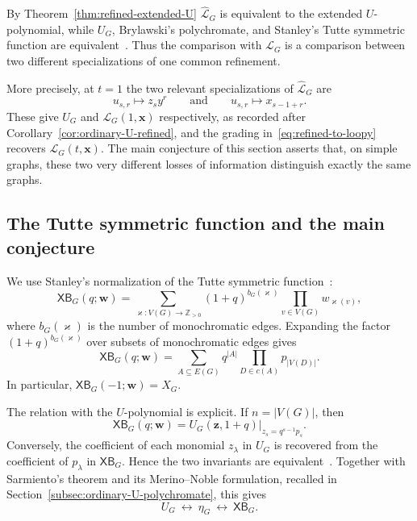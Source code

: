 \documentclass[11pt]{article}
\theoremstyle{plain}
\theoremstyle{definition}
\renewcommand{\mathcal}{\mathscr}
\newcommand{\LL}{\mathcal{L}}    %
\newcommand{\bw}{\mathbf{w}}
\newcommand{\bx}{\mathbf{x}}
\newcommand{\bz}{\mathbf{z}}
\newcommand{\XB}{\mathsf{XB}} %
\newcommand{\kp}{\varkappa}
\newcommand{\ZZ}{\mathbb Z}
\numberwithin{equation}{section}
\begin{document}
By Theorem~\ref{thm:refined-extended-U}
$\widehat{\LL}_G$ is equivalent to the extended
$U$-polynomial, while $U_G$, Brylawski's polychromate, and Stanley's Tutte
symmetric function are equivalent~\cite{NW,Sar,MN,Nob}.  Thus the comparison
with $\LL_G$ is a comparison between two different specializations of one common refinement.

More precisely, at $t=1$ the two relevant specializations of $\widehat{\LL}_G$ are
\begin{equation}\label{eq:two-specializations}
   u_{s,r}\longmapsto z_s y^r
   \qquad\text{and}\qquad
   u_{s,r}\longmapsto x_{s-1+r}.
\end{equation}
These give $U_G$ and $\LL_G(1,\bx)$ respectively, as recorded after
Corollary~\ref{cor:ordinary-U-refined}, and the grading
in~\eqref{eq:refined-to-loopy} recovers $\LL_G(t,\bx)$.  The main conjecture
of this section asserts that, on simple graphs, these two very different
losses of information distinguish exactly the same graphs.

\subsection{The Tutte symmetric function and the main conjecture}
\label{subsec:main-conjecture}

We use Stanley's normalization of the Tutte symmetric function~\cite{Sta2}:
\begin{equation}\label{eq:XB-coloring}
   \XB_G(q;\bw)
   =
   \sum_{\kp:V(G)\to\ZZ_{>0}}
   (1+q)^{b_G(\kp)}
   \prod_{v\in V(G)}w_{\kp(v)},
\end{equation}
where $b_G(\kp)$ is the number of monochromatic edges.  Expanding the
factor $(1+q)^{b_G(\kp)}$ over subsets of monochromatic edges gives
\begin{equation}\label{eq:XB-subgraph}
   \XB_G(q;\bw)
   =
   \sum_{A\subseteq E(G)}q^{|A|}
   \prod_{D\in c(A)}p_{|V(D)|}.
\end{equation}
In particular, $\XB_G(-1;\bw)=X_G$.

The relation with the $U$-polynomial is explicit.  If
$n=|V(G)|$, then
\begin{equation}\label{eq:XB-from-U}
   \XB_G(q;\bw)
   =
   \left.
      U_G(\bz,1+q)
   \right|_{z_s=q^{s-1}p_s}.
\end{equation}
Conversely, the coefficient of each monomial $z_\lambda$ in $U_G$ is
recovered from the coefficient of $p_\lambda$ in $\XB_G$.  Hence the two
invariants are equivalent~\cite{NW,MN,Nob}.  Together with Sarmiento's theorem
and its Merino--Noble formulation, recalled in
Section~\ref{subsec:ordinary-U-polychromate}, this gives
\[
   U_G\ \longleftrightarrow\ \eta_G\ \longleftrightarrow\ \XB_G.
\]
\end{document}
